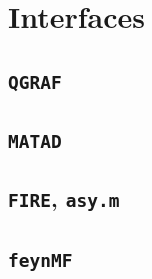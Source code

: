\documentclass{article}
\begin{document}
\section{Interfaces}

\subsection{{\tt QGRAF}}

\subsection{{\tt MATAD}}

\subsection{{\tt FIRE}, {\tt asy.m}}

\subsection{{\tt feynMF}}
\end{document}
